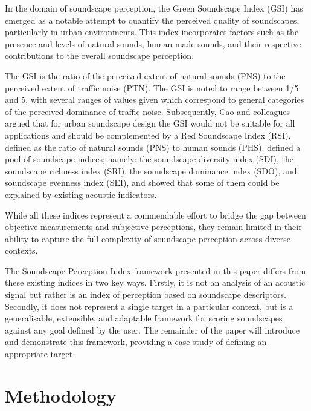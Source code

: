 \documentclass[
  authoryear,
  preprint,
  3p]{elsarticle}
\begin{document}
In the domain of soundscape perception, the Green Soundscape Index (GSI)
\citep{Kogan2018Green} has emerged as a notable attempt to quantify the
perceived quality of soundscapes, particularly in urban environments.
This index incorporates factors such as the presence and levels of
natural sounds, human-made sounds, and their respective contributions to
the overall soundscape perception.

The GSI is the ratio of the perceived extent of natural sounds (PNS) to
the perceived extent of traffic noise (PTN). The GSI is noted to range
between 1/5 and 5, with several ranges of values given which correspond
to general categories of the perceived dominance of traffic noise.
Subsequently, Cao and colleagues \citep{Cao2020Red, Yang2022Effects}
argued that for urban soundscape design the GSI would not be suitable
for all applications and should be complemented by a Red Soundscape
Index (RSI), defined as the ratio of natural sounds (PNS) to human
sounds (PHS). \citet{Xiang2023Soundscape} defined a pool of soundscape
indices; namely: the soundscape diversity index (SDI), the soundscape
richness index (SRI), the soundscape dominance index (SDO), and
soundscape evenness index (SEI), and showed that some of them could be
explained by existing acoustic indicators.

While all these indices represent a commendable effort to bridge the gap
between objective measurements and subjective perceptions, they remain
limited in their ability to capture the full complexity of soundscape
perception across diverse contexts.

The Soundscape Perception Index framework presented in this paper
differs from these existing indices in two key ways. Firstly, it is not
an analysis of an acoustic signal but rather is an index of perception
based on soundscape descriptors. Secondly, it does not represent a
single target in a particular context, but is a generalisable,
extensible, and adaptable framework for scoring soundscapes against any
goal defined by the user. The remainder of the paper will introduce and
demonstrate this framework, providing a case study of defining an
appropriate target.

\section{Methodology}\label{sec-method}
\end{document}
